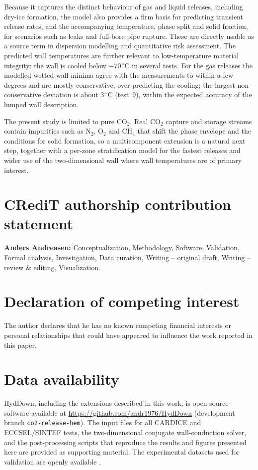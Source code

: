 \documentclass[5p,authoryear]{elsarticle}
\begin{document}
Because it captures the distinct behaviour of gas and liquid releases, including dry-ice formation,
the model also provides a firm basis for predicting transient release rates, and the accompanying
temperature, phase split and solid fraction, for scenarios such as leaks and full-bore pipe rupture.
These are directly usable as a source term in dispersion modelling and quantitative risk assessment.
The predicted wall temperatures are further relevant to low-temperature material integrity: the wall
is cooled below $-70\,^\circ$C in several tests. For the gas releases the modelled wetted-wall minima
agree with the measurements to within a few degrees and are mostly conservative, over-predicting the
cooling; the largest non-conservative deviation is about $3\,^\circ$C (test~9), within the expected
accuracy of the lumped wall description.

The present study is limited to pure CO$_2$. Real CO$_2$ capture and storage streams contain
impurities such as N$_2$, O$_2$ and CH$_4$ that shift the phase envelope and the conditions for
solid formation, so a multicomponent extension is a natural next step, together with a per-zone
stratification model for the fastest releases and wider use of the two-dimensional wall where wall
temperatures are of primary interest.

\section*{CRediT authorship contribution statement}
\textbf{Anders Andreasen:} Conceptualization, Methodology, Software, Validation, Formal analysis,
Investigation, Data curation, Writing -- original draft, Writing -- review \& editing,
Visualization.

\section*{Declaration of competing interest}
The author declares that he has no known competing financial interests or personal relationships
that could have appeared to influence the work reported in this paper.

\section*{Data availability}
HydDown, including the extensions described in this work, is open-source software available at
\url{https://github.com/andr1976/HydDown} (development branch \texttt{co2-release-hem}). The input
files for all CARDICE and ECCSEL/SINTEF tests, the two-dimensional conjugate wall-conduction solver,
and the post-processing scripts that reproduce the results and figures presented here are provided as
supporting material. The experimental datasets used for validation are openly available
\citep{CardiceData2025, HoydalsvikData2026}.
\end{document}
